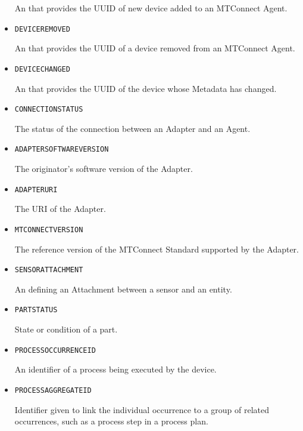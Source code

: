 \begin{itemize}
An  that provides the \gls{UUID} of new device added to an \gls{MTConnect Agent}.


\item \texttt{DEVICE\textunderscore REMOVED}  

An  that provides the \gls{UUID} of a device removed from an \gls{MTConnect Agent}.


\item \texttt{DEVICE\textunderscore CHANGED}  

An  that provides the \gls{UUID} of the device whose \gls{Metadata} has changed.


\item \texttt{CONNECTION\textunderscore STATUS}  

The status of the connection between an \gls{Adapter} and an \gls{Agent}.


\item \texttt{ADAPTER\textunderscore SOFTWARE\textunderscore VERSION}  

The originator’s software version of the \gls{Adapter}.


\item \texttt{ADAPTER\textunderscore URI}  

The \gls{URI} of the \gls{Adapter}.


\item \texttt{MTCONNECT\textunderscore VERSION}  

The reference version of the MTConnect Standard supported by the \gls{Adapter}.


\item \texttt{SENSOR\textunderscore ATTACHMENT}  

An  defining an \gls{Attachment} between a sensor and an entity.


\item \texttt{PART\textunderscore STATUS}  

State or condition of a part.


\item \texttt{PROCESS\textunderscore OCCURRENCE\textunderscore ID}  

An identifier of a process being executed by the device.


\item \texttt{PROCESS\textunderscore AGGREGATE\textunderscore ID}  

Identifier given to link the individual occurrence to a group of related occurrences, such as a process step in a process plan.



\end{itemize}
